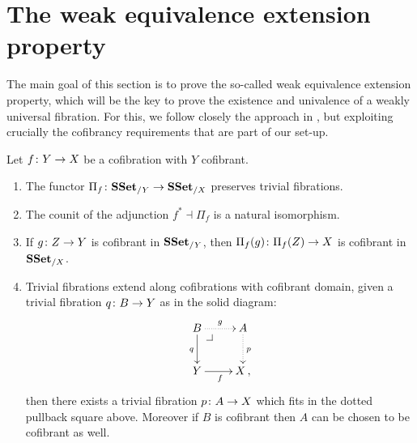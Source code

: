 \documentclass[reqno,10pt,a4paper,oneside,draft]{amsart}
\begin{document}
\section{The weak equivalence extension property}
\label{sec:equep}

The main goal of this section is to prove the so-called weak equivalence extension property, which will be the key to prove the existence and univalence of a weakly universal fibration.  For this, we follow closely the approach in \cite{voevodsky-simplicial-model}, but exploiting crucially the cofibrancy requirements that are part of our set-up.



\begin{lemma}\label{Lemma:ForTheExtProperty} Let $f \colon Y \rightarrow X$ be a cofibration with $Y$ cofibrant. 
\begin{enumerate}[$(i)$]
\item The functor $\Pi_f \colon \mathbf{SSet}_{/Y} \rightarrow \mathbf{SSet}_{/X}$ preserves trivial fibrations.
\item The counit of the adjunction $f^* \dashv \Pi_f$ is a natural isomorphism.
\item If $g \colon Z \to Y$  is cofibrant in $\mathbf{SSet}_{/Y}$, then $\Pi_f(g) \colon \Pi_f(Z) \to X$  is cofibrant in~$\mathbf{SSet}_{/X}$.
\item Trivial fibrations extend along cofibrations with cofibrant domain, \ie given a trivial fibration $q
 \colon B \to Y$  as in the solid diagram:
\[
\xymatrix{
B \ar@{.>}[r]^{g} \ar[d]_{q} \drpullback  & A \ar@{.>}[d]^{p} \\
Y \ar[r]_f &  X \, ,}
\]
then there exists a trivial fibration $p \colon A \rightarrow X$ which fits in the dotted pullback square above. Moreover if $B$ is cofibrant  then 
$A$ can be chosen to be 
cofibrant as well.
\end{enumerate}
\end{lemma}
\end{document}
